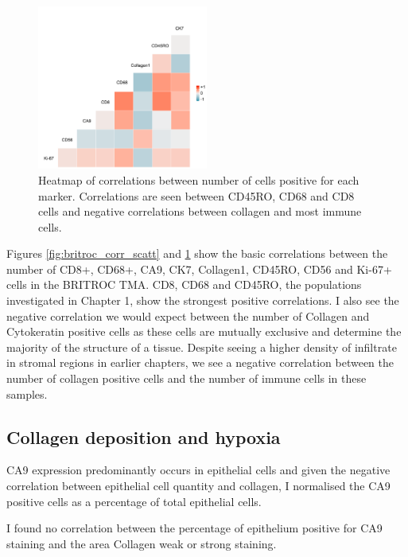 \begin{figure}
    \centering
    \includegraphics[width=0.5\textwidth]{Chapter2/Figs/Raster/correlation_britroc.png}
    \caption[Heatmap of correlations between number of cells positive for each marker]{Heatmap of correlations between number of cells positive for each marker. Correlations are seen between CD45RO, CD68 and CD8 cells and negative correlations between collagen and most immune cells.}
    \label{fig:britroc_corr_heat}
\end{figure}

Figures \ref{fig:britroc_corr_scatt} and \ref{fig:britroc_corr_heat} show the basic correlations between the number of CD8+, CD68+, CA9, CK7, Collagen1, CD45RO, CD56 and Ki-67+ cells in the BRITROC TMA. CD8, CD68 and CD45RO, the populations investigated in Chapter 1, show the strongest positive correlations. I also see the negative correlation we would expect between the number of Collagen and Cytokeratin positive cells as these cells are mutually exclusive and determine the majority of the structure of a tissue. Despite seeing a higher density of infiltrate in stromal regions in earlier chapters, we see a negative correlation between the number of collagen positive cells and the number of immune cells in these samples.


\subsection{Collagen deposition and hypoxia}
CA9 expression predominantly occurs in epithelial cells and given the negative correlation between epithelial cell quantity and collagen,  I normalised the CA9 positive cells as a percentage of total epithelial cells. 

I found no correlation between the percentage of epithelium positive for CA9 staining and the area Collagen weak or strong staining. 



